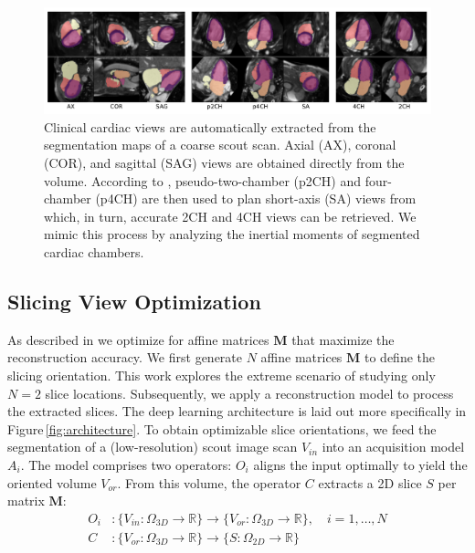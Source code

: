     \begin{figure}[H]
            \includegraphics[width=\linewidth]{figures/prealign.pdf}
            \caption{Clinical cardiac views are automatically extracted from the segmentation maps of a coarse scout scan. Axial (AX), coronal (COR), and sagittal (SAG) views are obtained directly from the volume. According to \cite{herzog2017cardiovascular}, pseudo-two-chamber (p2CH) and four-chamber (p4CH) are then used to plan short-axis (SA) views from which, in turn, accurate 2CH and 4CH views can be retrieved. We mimic this process by analyzing the inertial moments of segmented cardiac chambers.}
        \label{fig:prealign}
    \end{figure}



    \subsection{Slicing View Optimization}
     As described in 
 we optimize for affine matrices $\mathbf{M}$ that maximize the reconstruction accuracy.
    We first generate $N$ affine matrices $\mathbf{M}$ to define the slicing orientation. This work explores the extreme scenario of studying only $N=2$ slice locations. Subsequently, we apply a reconstruction model to process the extracted slices.
    The deep learning architecture is laid out more specifically in Figure\,\ref{fig:architecture}.
    To obtain optimizable slice orientations, we feed the segmentation of a (low-resolution) scout image scan $V_{in}$ into an acquisition model $A_i$. The model comprises two operators: $O_i$ aligns the input optimally to yield the oriented volume $V_{or}$.  From this volume, the operator $C$ extracts a 2D slice $S$ per matrix $\mathbf{M}$:
    \begin{align}
        O_i&: \{ V_{in}:\Omega_{3D} \rightarrow \mathbb{R}\} \rightarrow \{ V_{or}: \Omega_{3D} \rightarrow \mathbb{R}\}, \quad i = 1,\dots,N \label{eq:orientation} \\
        C&: \{ V_{or}:\Omega_{3D} \rightarrow \mathbb{R}\} \rightarrow \{ S: \Omega_{2D} \rightarrow \mathbb{R}\} \label{eq:slicing}
    \end{align}


